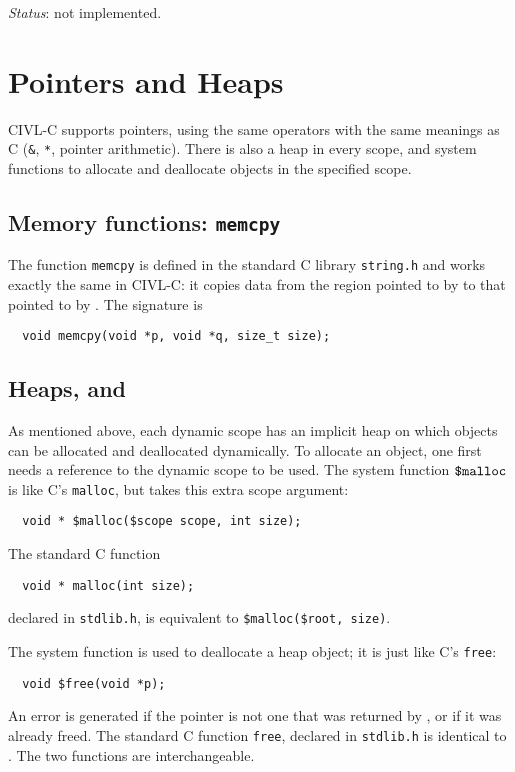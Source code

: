 \emph{Status}: not implemented.

\chapter{Pointers and Heaps}
\label{chap:pointers}

CIVL-C supports pointers, using the same operators with the same
meanings as C (\texttt{\&}, \texttt{*}, pointer arithmetic).  There is
also a heap in every scope, and system functions to allocate and
deallocate objects in the specified scope.

\section{Memory functions: \texttt{memcpy}}

The function \texttt{memcpy} is defined in the standard C library
\texttt{string.h} and works exactly the same in CIVL-C: it copies
data from the region pointed to by  to that pointed to by
.  The signature is

\begin{verbatim}
  void memcpy(void *p, void *q, size_t size);
\end{verbatim}

\section{Heaps, \cmalloc{} and \cfree}

As mentioned above, each dynamic scope has an implicit heap on which
objects can be allocated and deallocated dynamically.  To allocate an
object, one first needs a reference to the dynamic scope to be used.
The system function $\mbox{\texttt{\${}malloc}}$ is like C's \texttt{malloc}, but takes
this extra scope argument:
\begin{verbatim}
  void * $malloc($scope scope, int size);
\end{verbatim}
The standard C function
\begin{verbatim}
  void * malloc(int size);
\end{verbatim}
declared in \texttt{stdlib.h}, is equivalent to \verb!$malloc($root, size)!.

The system function \cfree{} is used to deallocate a heap object;
it is just like C's \texttt{free}:
\begin{verbatim}
  void $free(void *p);
\end{verbatim}
An error is generated if the pointer is not one that was returned by
\cmalloc, or if it was already freed.  The standard C function
\texttt{free}, declared in \texttt{stdlib.h} is identical to \cfree.
The two functions are interchangeable.

